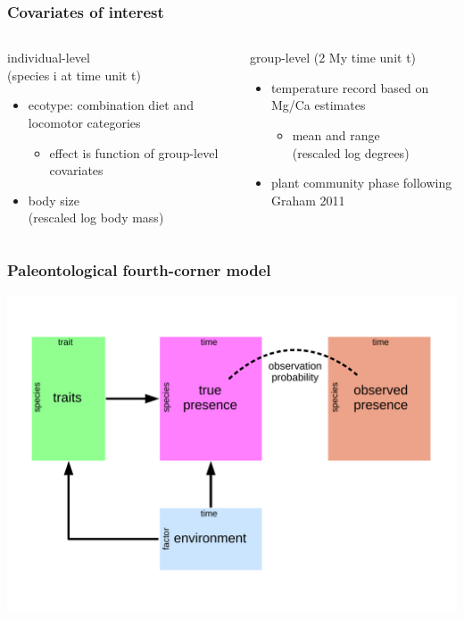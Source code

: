 \documentclass{beamer}
\begin{document}
\begin{frame}
  \frametitle{Covariates of interest}
  \begin{columns}
    \begin{column}{0.5\textwidth}
      individual-level \\(species i at time unit t)
      \begin{itemize}
        \item ecotype: combination diet and locomotor categories
          \begin{itemize}
            \item effect is function of group-level covariates
          \end{itemize}
        \item body size \\(rescaled log body mass)
      \end{itemize}
    \end{column}
    \begin{column}{0.5\textwidth}
      group-level (2 My time unit t)
      \begin{itemize}
        \item temperature record based on Mg/Ca estimates
          \begin{itemize}
            \item mean and range \\(rescaled log degrees)
          \end{itemize}
        \item plant community phase following Graham 2011
      \end{itemize}
    \end{column}
  \end{columns}
\end{frame}

\begin{frame}
  \frametitle{Paleontological fourth-corner model}
  \begin{center}
    \includegraphics[height=0.8\textheight,width=\textwidth,keepaspectratio=true]{figure/paleo_fourth_corner}
  \end{center}

\end{frame}
\end{document}
